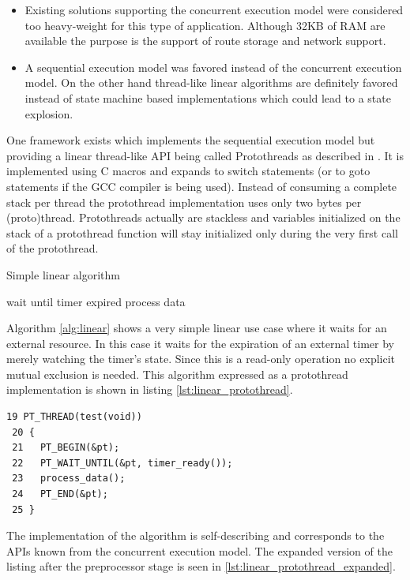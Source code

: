 \begin{itemize}
    \item Existing solutions supporting the concurrent execution model were considered too heavy-weight for this type of application. Although 32KB of RAM are available the purpose is the support of route storage and network support.
    \item A sequential execution model was favored instead of the concurrent execution model. On the other hand thread-like linear algorithms are definitely favored instead of state machine based implementations which could lead to a state explosion.
\end{itemize}

One framework exists which implements the sequential execution model but providing a linear thread-like API being called Protothreads as described in \cite{dunkels}. It is implemented using C macros and expands to switch statements (or to goto statements if the GCC compiler is being used). Instead of consuming a complete stack per thread the protothread implementation uses only two bytes per (proto)thread. Protothreads actually are stackless and variables initialized on the stack of a protothread function will stay initialized only during the very first call of the protothread.

\begin{algorithm}[H]
\caption{Simple linear algorithm}
\label{alg:linear}
\begin{algorithmic}
    \STATE wait until timer expired
    \STATE process data
\ENDWHILE
\end{algorithmic}
\end{algorithm}

Algorithm \ref{alg:linear} shows a very simple linear use case where it waits for an external resource. In this case it waits for the expiration of an external timer by merely watching the timer's state. Since this is a read-only operation no explicit mutual exclusion is needed. This algorithm expressed as a protothread implementation is shown in listing \ref{lst:linear_protothread}.

\begin{lstlisting}[label=lst:linear_protothread,caption=linear protothread implementation]
 19 PT_THREAD(test(void))
 20 {
 21   PT_BEGIN(&pt);
 22   PT_WAIT_UNTIL(&pt, timer_ready());
 23   process_data();
 24   PT_END(&pt);
 25 }
\end{lstlisting}

The implementation of the algorithm is self-describing and corresponds to the APIs known from the concurrent execution model. The expanded version of the listing after the preprocessor stage is seen in \ref{lst:linear_protothread_expanded}.

